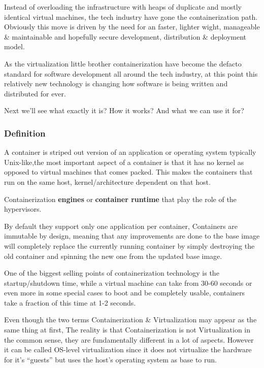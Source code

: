 \documentclass[
  14pt,
  english,
  a4paper,
]{scrreprt}
\begin{document}
Instead of overloading the infrastructure with heaps of duplicate and
mostly identical virtual machines, the tech industry have gone the
containerization path. Obviously this move is driven by the need for an
faster, lighter wight, manageable \& maintainable and hopefully secure
development, distribution \& deployment model.

As the virtualization little brother containerization have become the
defacto standard for software development all around the tech industry,
at this point this relatively new technology is changing how software is
being written and distributed for ever.

Next we'll see what exactly it is? How it works? And what we can use it
for?

\hypertarget{definition-3}{%
\subsubsection{Definition}\label{definition-3}}

A container is striped out version of an application or operating system
typically Unix-like,the most important aspect of a container is that it
has no kernel as opposed to virtual machines that comes packed. This
makes the containers that run on the same host, kernel/architecture
dependent on that host.

Containerization \textbf{engines} or \textbf{container runtime} that
play the role of the hypervisors.

By default they support only one application per container, Containers
are immutable by design, meaning that any improvements are done to the
base image will completely replace the currently running container by
simply destroying the old container and spinning the new one from the
updated base image.

One of the biggest selling points of containerization technology is the
startup/shutdown time, while a virtual machine can take from 30-60
seconds or even more in some special cases to boot and be completely
usable, containers take a fraction of this time at 1-2 seconds.

Even though the two terms Containerization \& Virtualization may appear
as the same thing at first, The reality is that Containerization is not
Virtualization in the common sense, they are fundamentally different in
a lot of aspects. However it can be called OS-level virtualization since
it does not virtualize the hardware for it's ``guests'' but uses the
host's operating system as base to run.
\end{document}
